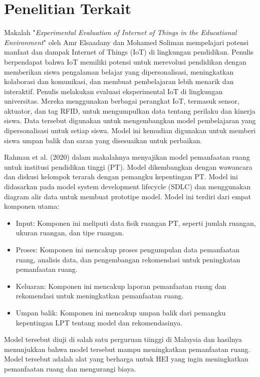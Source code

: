 \section{Penelitian Terkait}
\label{sec:penelitianterkait}


Makalah "\emph{Experimental Evaluation of Internet of Things in the Educational Environment}" oleh Amr Elsaadany dan Mohamed Soliman mempelajari potensi manfaat dan dampak Internet of Things (IoT) di lingkungan pendidikan. Penulis berpendapat bahwa IoT memiliki potensi untuk merevolusi pendidikan dengan memberikan siswa pengalaman belajar yang dipersonalisasi, meningkatkan kolaborasi dan komunikasi, dan membuat pembelajaran lebih menarik dan interaktif.
Penulis melakukan evaluasi eksperimental IoT di lingkungan universitas. Mereka menggunakan berbagai perangkat IoT, termasuk sensor, aktuator, dan tag RFID, untuk mengumpulkan data tentang perilaku dan kinerja siswa. Data tersebut digunakan untuk mengembangkan model pembelajaran yang dipersonalisasi untuk setiap siswa. Model ini kemudian digunakan untuk memberi siswa umpan balik dan saran yang disesuaikan untuk perbaikan.

Rahman et al. (2020) dalam makalahnya menyajikan model pemanfaatan ruang untuk institusi pendidikan tinggi (PT). Model dikembangkan dengan wawancara dan diskusi kelompok terarah dengan pemangku kepentingan PT. Model ini didasarkan pada model system development lifecycle (SDLC) dan menggunakan diagram alir data untuk membuat prototipe model.
Model ini terdiri dari empat komponen utama:
\begin{itemize}
    \item Input: Komponen ini meliputi data fisik ruangan PT, seperti jumlah ruangan, ukuran ruangan, dan tipe ruangan.
    \item Proses: Komponen ini mencakup proses pengumpulan data pemanfaatan ruang, analisis data, dan pengembangan rekomendasi untuk peningkatan pemanfaatan ruang.
    \item Keluaran: Komponen ini mencakup laporan pemanfaatan ruang dan rekomendasi untuk meningkatkan pemanfaatan ruang.
    \item Umpan balik: Komponen ini mencakup umpan balik dari pemangku kepentingan LPT tentang model dan rekomendasinya.
\end{itemize}
Model tersebut diuji di salah satu perguruan tiinggi di Malaysia dan hasilnya menunjukkan bahwa model tersebut mampu meningkatkan pemanfaatan ruang. Model tersebut adalah alat yang berharga untuk HEI yang ingin meningkatkan pemanfaatan ruang dan mengurangi biaya.

